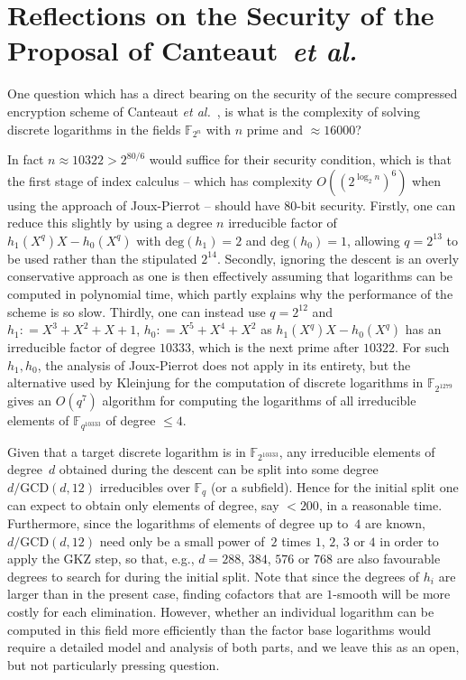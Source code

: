 \documentclass[11pt]{llncs}
\newcommand{\F}{\mathbb F}
\newcommand{\ea}{\emph{et al.}}
\newcommand{\defeq}{\mathrel{\mathop:}=}
\begin{document}

\section{Reflections on the Security of the Proposal of Canteaut~\ea}\label{sec:canteaut}

One question which has a direct bearing on the security of the secure compressed encryption scheme of Canteaut \emph{et al.}~\cite{Canteaut}, is what is 
the complexity of solving discrete logarithms in the fields $\F_{2^{n}}$ with $n$ prime and $\approx \num{16000}$? 

In fact $n \approx \num{10322} > 2^{80/6}$ would suffice for their security condition, which is that the first stage of index calculus -- 
which has complexity $O((2^{\log_2 n})^6)$ when using the approach of Joux-Pierrot -- should have $80$-bit security. Firstly, one can reduce this 
slightly by using a degree $n$ irreducible factor of $h_1(X^q) X - h_0(X^q)$ with $\text{deg}(h_1) = 2$ and $\text{deg}(h_0) = 1$, allowing 
$q=2^{13}$ to be used rather than the stipulated $2^{14}$. Secondly, 
ignoring the descent is an overly conservative approach as one is then effectively assuming that logarithms can be computed in polynomial time, which 
partly explains why the performance of the scheme is so slow. Thirdly, one can instead use $q = 2^{12}$ and $h_1 \defeq X^3 + X^2 + X + 1$, 
$h_0 \defeq X^5 + X^4 + X^2$ as $h_1(X^q) X - h_0(X^q)$ has an irreducible factor of degree $\num{10333}$, 
which is the next prime after $\num{10322}$. For such 
$h_1,h_0$, the analysis of Joux-Pierrot does not apply in its entirety, but the alternative used by Kleinjung for the computation of discrete logarithms 
in $\F_{2^{1279}}$~\cite{1279Ann} gives an $O(q^7)$ algorithm for computing the logarithms of all irreducible elements of $\F_{q^{10333}}$ of 
degree $\le 4$.

Given that a target discrete logarithm is in $\F_{2^{10333}}$, any irreducible elements of degree~$d$ obtained during the descent can be split into some
degree $d / \text{GCD}(d, 12)$ irreducibles over $\F_q$ (or a subfield).  Hence for the initial split one can expect to obtain only elements of degree,
say $< 200$, in a reasonable time.  Furthermore, since the logarithms of elements of degree up to~$4$ are known, $d / \text{GCD}(d, 12)$ need only be a small power
of~$2$ times $1$, $2$, $3$ or $4$ in order to apply the GKZ step, so that, e.g., $d = 288$, $384$, $576$ or $768$ are also favourable degrees to search for during the initial split.
Note that since the degrees of $h_i$ are larger than in the present case, finding cofactors that are $1$-smooth will be more costly for each elimination. 
However, whether an individual logarithm can be computed in this field more efficiently than the factor base logarithms would require a detailed model and 
analysis of both parts, and we leave this as an open, but not particularly pressing question.
\end{document}
